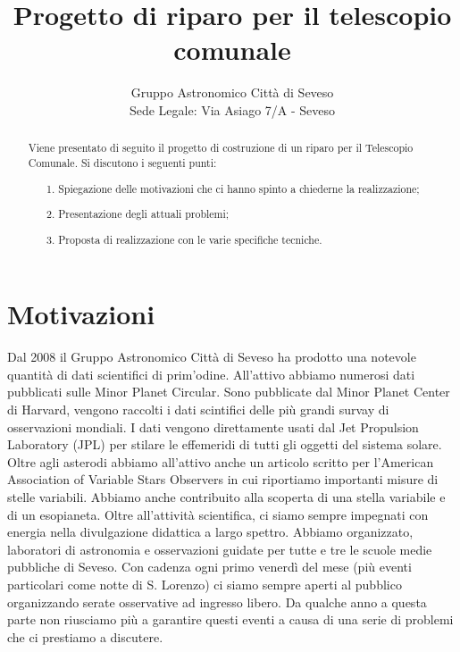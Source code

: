\documentclass[a4paper,12pt]{article}
\begin{document}
\title{\bf \Huge Progetto di riparo per il telescopio comunale\\ }


\author{Gruppo Astronomico Città di Seveso\\
Sede Legale: Via Asiago 7/A - Seveso
}


\maketitle
\begin{abstract}
Viene presentato di seguito il progetto di costruzione di un riparo per il Telescopio Comunale. Si discutono i seguenti punti:
	\begin{itemize}
		\item[1.] Spiegazione delle motivazioni che ci hanno spinto a chiederne la realizzazione;
		\item[2.] Presentazione degli attuali problemi;
		\item[3.] Proposta di realizzazione con le varie specifiche tecniche.
	\end{itemize}
\end{abstract}

\section{Motivazioni}
Dal 2008 il Gruppo Astronomico Citt\`a di Seveso ha prodotto una notevole quantit\`a di dati scientifici di prim'odine. All'attivo abbiamo numerosi dati pubblicati sulle Minor Planet Circular. Sono pubblicate dal Minor Planet Center di Harvard, vengono raccolti i dati scintifici delle pi\`u grandi survay di osservazioni mondiali. I dati vengono direttamente usati dal Jet Propulsion Laboratory (JPL) per stilare le effemeridi di tutti gli oggetti del sistema solare. Oltre agli asterodi abbiamo all'attivo anche un articolo scritto per l'American Association of Variable Stars Observers in cui riportiamo importanti misure di stelle variabili. Abbiamo anche contribuito alla scoperta di una stella variabile e di un esopianeta. Oltre all'attivit\`a scientifica, ci siamo sempre impegnati con energia nella divulgazione didattica a largo spettro. Abbiamo organizzato, laboratori di astronomia e osservazioni guidate per tutte e tre le scuole medie pubbliche di Seveso. Con cadenza ogni primo venerd\`i del mese (pi\`u eventi particolari come notte di S. Lorenzo) ci siamo sempre aperti al pubblico organizzando serate osservative ad ingresso libero. Da qualche anno a questa parte non riusciamo pi\`u a garantire questi eventi a causa di una serie di problemi che ci prestiamo a discutere.
\end{document}
